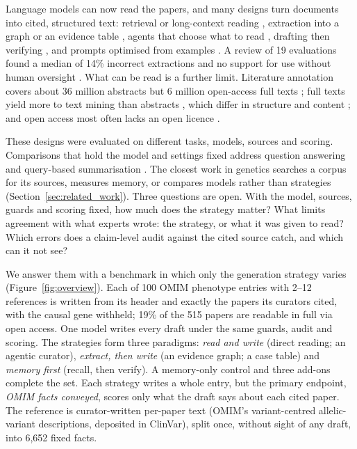 \documentclass{article} %
\begin{document}
Language models can now read the papers, and many designs turn documents into cited, structured text: retrieval \citep{Lewis2020RetrievalaugmentedGeneration} or long-context reading \citep{li2024retrieval}, extraction into a graph \citep{edge2024local} or an evidence table \citep{joshi2026sliders}, agents that choose what to read \citep{Lla2023PaperqaRetrievalaugmented,skarlinski2024language}, drafting then verifying \citep{dhuliawala2024chainofverification}, and prompts optimised from examples \citep{agrawal2026gepa}. A review of 19 evaluations found a median of 14\% incorrect extractions and no support for use without human oversight \citep{Clark2025GenerativeArtificial}. What can be read is a further limit. Literature annotation covers about 36 million abstracts but 6 million open-access full texts \citep{wei2024pubtator}; full texts yield more to text mining than abstracts \citep{Westergaard2018ComprehensiveQuantitative,Wei2019PubtatorCentral}, which differ in structure and content \citep{Cohen2010StructuralContent}; and open access most often lacks an open licence \citep{Piwowar2018StateOa}.

These designs were evaluated on different tasks, models, sources and scoring. Comparisons that hold the model and settings fixed address question answering and query-based summarisation \citep{li2024retrieval,Li2025LaraBenchmarking,han2025rag}. The closest work in genetics searches a corpus for its sources, measures memory, or compares models rather than strategies (Section~\ref{sec:related_work}). Three questions are open. With the model, sources, guards and scoring fixed, how much does the strategy matter? What limits agreement with what experts wrote: the strategy, or what it was given to read? Which errors does a claim-level audit against the cited source catch, and which can it not see?

We answer them with a benchmark in which only the generation strategy varies (Figure~\ref{fig:overview}). Each of 100 OMIM phenotype entries with 2--12 references is written from its header and exactly the papers its curators cited, with the causal gene withheld; 19\% of the 515 papers are readable in full via open access. One model writes every draft under the same guards, audit and scoring. The strategies form three paradigms: \emph{read and write} (direct reading; an agentic curator), \emph{extract, then write} (an evidence graph; a case table) and \emph{memory first} (recall, then verify). A memory-only control and three add-ons complete the set. Each strategy writes a whole entry, but the primary endpoint, \emph{OMIM facts conveyed}, scores only what the draft says about each cited paper. The reference is curator-written per-paper text (OMIM's variant-centred allelic-variant descriptions, deposited in ClinVar), split once, without sight of any draft, into 6,652 fixed facts.
\end{document}
